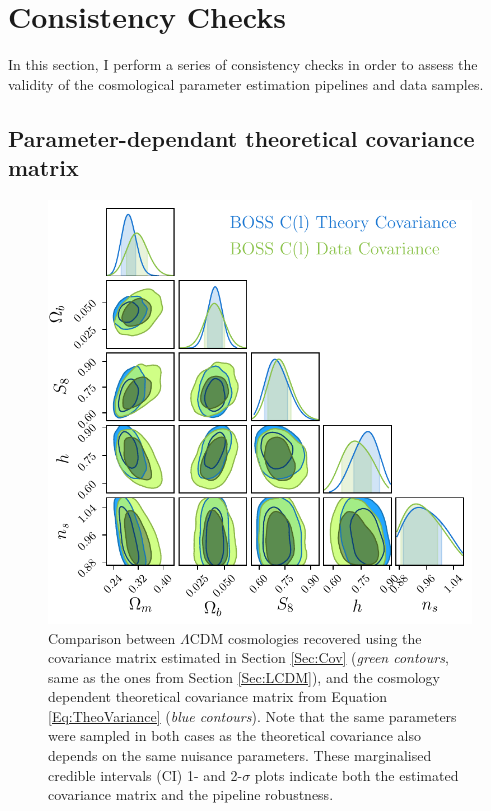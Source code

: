 \section{Consistency Checks}
In this section, I perform a series of consistency checks in order to assess the validity of the cosmological parameter estimation pipelines and data samples. 

\subsection{Parameter-dependant theoretical covariance matrix}
\begin{figure}
\begin{center}
\includegraphics[scale=0.75]{BOSS-FIGS/theoryCovContours.pdf}
\caption[Comparison between $\Lambda$CDM cosmologies recovered using the covariance matrix estimated in Section \ref{Sec:Cov}and the cosmology dependent theoretical covariance matrix from Equation \eqref{Eq:TheoVariance}.]{Comparison between $\Lambda$CDM cosmologies recovered using the covariance matrix estimated in Section \ref{Sec:Cov} (\textit{green contours}, same as the ones from Section \ref{Sec:LCDM}), and the cosmology dependent theoretical covariance matrix from Equation \eqref{Eq:TheoVariance} (\textit{blue contours}). Note that the same parameters were sampled in both cases as the theoretical covariance also depends on the same nuisance parameters. These marginalised credible intervals (CI) 1- and 2-$\sigma$ plots indicate both the estimated covariance matrix and the \uclcl pipeline robustness.}
\label{fig:TheoryCovTriangle}
\end{center}
\end{figure}


